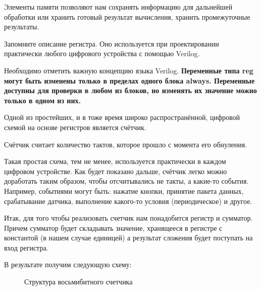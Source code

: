 \documentclass[a5paper, DIV=14, headings=openany, twoside=true,fontsize=10pt, titlepage]{scrreprt}
\newcommand{\eng}[1]{\foreignlanguage{english}{#1}}
\begin{document}
\par{Элементы памяти позволяют нам сохранять информацию для дальнейшей обработки или хранить готовый результат вычисления, хранить промежуточные результаты.}

\par{Запомните описание регистра. Оно используется при проектировании практически любого цифрового устройства с помощью \eng{Verilog}.}	

\par{Необходимо отметить важную концепцию языка \eng{Verilog}. \textbf{Переменные типа \eng{reg} могут быть изменены только в пределах одного блока \eng{always}. Переменные доступны для проверки в любом из блоков, но изменять их значение можно только в одном из них.}}	



\par{Одной из простейших, и в тоже время широко распространённой, цифровой схемой на основе регистров является счётчик.}

\par{Счётчик считает количество тактов, которое прошло с момента его обнуления.}
		
\par{Такая простая схема, тем не менее, используется практически в каждом цифровом устройстве. Как будет показано дальше, счётчик легко можно доработать таким образом, чтобы отсчитывались не такты, а какие-то события. Например, событиями могут быть: нажатие кнопки, принятие пакета данных, срабатывание датчика, выполнение какого-то условия (периодическое) и другое.}		

\par{}

\par{Итак, для того чтобы реализовать счетчик нам понадобится регистр и сумматор. Причем сумматор будет складывать значение, хранящееся в регистре с константой (в нашем случае единицей) а результат сложения будет поступать на вход регистра.}		
		
\par{}

\par{В результате получим следующую схему:}

\begin{figure}[H]
	\centering
	\def\svgwidth{\columnwidth}
	
	\caption{Структура восьмибитного счетчика}
\end{figure}
		
\end{document}
